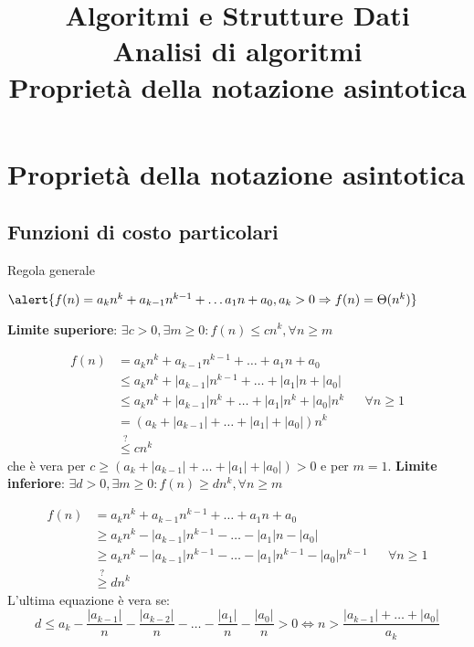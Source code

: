 \title[ASD - Analisi di algoritmi]{\textbf{Algoritmi e Strutture Dati}\\[18pt]Analisi di algoritmi\\Proprietà della notazione asintotica}

\FrameTitle{}

\section{Proprietà della notazione asintotica}

\subsection{Funzioni di costo particolari}
\begin{frame}{Regola generale}

\begin{myboxtitle}
$
  \alert{f(n) = a_k n^k + a_{k-1}n^{k-1} + \ldots a_1 n + a_0, a_k >0 \Rightarrow f(n) = \Theta(n^k)}  
$
\end{myboxtitle}

\begin{overprint}
\textbf{Limite superiore}: $\exists c>0, \exists m \geq 0: f(n) \leq cn^k, \forall n \geq m$

\begin{align*}
f(n) &= a_kn^k + a_{k-1}n^{k-1} +  \ldots  + a_1n + a_0 \\
     &\leq a_kn^k + |a_{k-1}|n^{k-1} +  \ldots  + |a_1|n + |a_0| \\
     &\leq a_kn^k + |a_{k-1}|n^k +  \ldots  + |a_1|n^k + |a_0|n^k && \forall n \geq 1\\
     &= (a_k + |a_{k-1}| +  \ldots  + |a_1| + |a_0|)n^k \\
     &\stackrel{?}{\leq} cn^k
\end{align*}
che è vera per $c \geq (a_k + |a_{k-1}| +  \ldots  + |a_1| + |a_0|) > 0$ e per $m = 1$.
\textbf{Limite inferiore}: $\exists d>0, \exists m \geq 0: f(n) \geq dn^k, \forall n \geq m$

\begin{align*}
f(n) &= a_kn^k + a_{k-1}n^{k-1} +  \ldots  + a_1n + a_0 \\
     &\geq a_kn^k - |a_{k-1}|n^{k-1} - \ldots  - |a_1|n - |a_0| \\
     &\geq a_kn^k - |a_{k-1}|n^{k-1} - \ldots  - |a_1|n^{k-1} - |a_0|n^{k-1} && \forall n \geq 1\\
     &\stackrel{?}{\geq} dn^k
\end{align*}
L'ultima equazione è vera se:
\[
  d \leq a_k - \frac{|a_{k-1}|}{n} - \frac{|a_{k-2}|}{n} -\ldots  - \frac{|a_1|}{n} - \frac{|a_0|}{n} > 0 \Leftrightarrow 
  n > \frac{|a_{k-1}| + \ldots + | a_0 |}{a_k}
\]
\end{overprint}
\end{frame}

